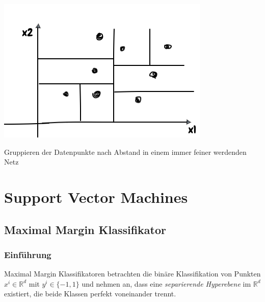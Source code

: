 \documentclass{report}
\begin{document}
\begin{center}
  \includegraphics[scale=.375]{ml05_7}
\end{center}

Gruppieren der Datenpunkte nach Abstand in einem immer feiner werdenden Netz

\chapter{Support Vector Machines}
\section{Maximal Margin Klassifikator}
\subsection{Einführung}

Maximal Margin Klassifikatoren betrachten die binäre Klassifikation von Punkten $x^i \in \mathbb{R}^d$ mit
$y^i \in \{-1, 1\}$ und nehmen an, dass eine \textit{separierende Hyperebene} im $\mathbb{R}^d$ existiert,
die beide Klassen perfekt voneinander trennt.
\end{document}
